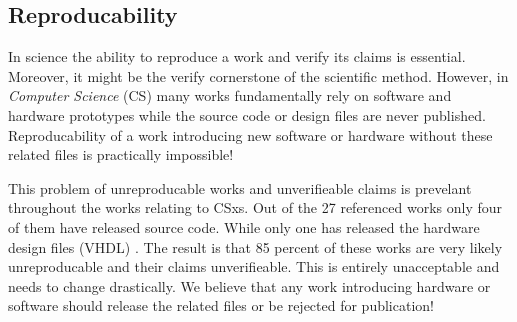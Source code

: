 


\subsection{Reproducability}

In science the ability to reproduce a work and verify its claims is essential.
Moreover, it might be the verify cornerstone of the scientific method. However,
in \textit{Computer Science} (CS) many works fundamentally rely on software and
hardware prototypes while the source code or design files are never published.
Reproducability of a work introducing new software or hardware without these
related files is practically impossible!

This problem of unreproducable works and unverifieable claims is prevelant
throughout the works relating to CSxs. Out of the 27 referenced works only four
\cite{10.14778/3137628.3137632, 234968, 8839401, lukken2021zcsd}
\footnotemark[8] of them have released source code. While only one has released the hardware design files
(VHDL) \cite{10.14778/3137628.3137632}. The result is that 85 percent of these
works are very likely unreproducable and their claims unverifieable. This is
entirely unacceptable and needs to change drastically. We believe that any work
introducing hardware or software should release the related files or be rejected
for publication!


